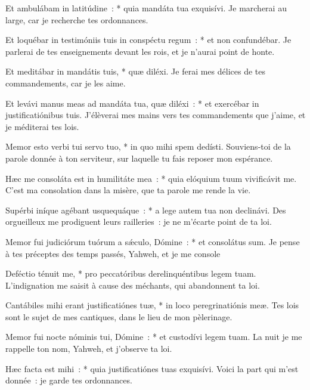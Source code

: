 \begin{paracol}{2}
\LigneParacol
{Et ambulábam in latitúdine~: * quia mandáta tua exquisívi.}
{Je marcherai au large, car je recherche tes ordonnances.}

\LigneParacol
{Et loquébar in testimóniis tuis in conspéctu regum~: * et non confundébar.}
{Je parlerai de tes enseignements devant les rois, et je n'aurai point de honte.}

\LigneParacol
{Et meditábar in mandátis tuis, * quæ diléxi.}
{Je ferai mes délices de tes commandements, car je les aime.}

\LigneParacol
{Et levávi manus meas ad mandáta tua, quæ diléxi~: * et exercébar in justificatiónibus tuis.}
{J'élèverai mes mains vers tes commandements que j'aime, et je méditerai tes lois. }

\LigneParacol
{Memor esto verbi tui servo tuo, * in quo mihi spem dedísti.}
{Souviens-toi de la parole donnée à ton serviteur, sur laquelle tu fais reposer mon espérance.}

\LigneParacol
{Hæc me consoláta est in humilitáte mea~: * quia elóquium tuum vivificávit me.}
{C'est ma consolation dans la misère, que ta parole me rende la vie.}

\LigneParacol
{Supérbi iníque agébant usquequáque~: * a lege autem tua non declinávi.}
{Des orgueilleux me prodiguent leurs railleries~: je ne m'écarte point de ta loi.}

\LigneParacol
{Memor fui judiciórum tuórum a sǽculo, Dómine~: * et consolátus sum.}
{Je pense à tes préceptes des temps passés, Yahweh, et je me console}

\LigneParacol
{Deféctio ténuit me, * pro peccatóribus derelinquéntibus legem tuam.}
{L'indignation me saisit à cause des méchants, qui abandonnent ta loi.}

\LigneParacol
{Cantábiles mihi erant justificatiónes tuæ, * in loco peregrinatiónis meæ.}
{Tes lois sont le sujet de mes cantiques, dans le lieu de mon pèlerinage.}

\LigneParacol
{Memor fui nocte nóminis tui, Dómine~: * et custodívi legem tuam.}
{La nuit je me rappelle ton nom, Yahweh, et j'observe ta loi.}

\LigneParacol
{Hæc facta est mihi~: * quia justificatiónes tuas exquisívi.}
{Voici la part qui m'est donnée~: je garde tes ordonnances.}

\end{paracol}
